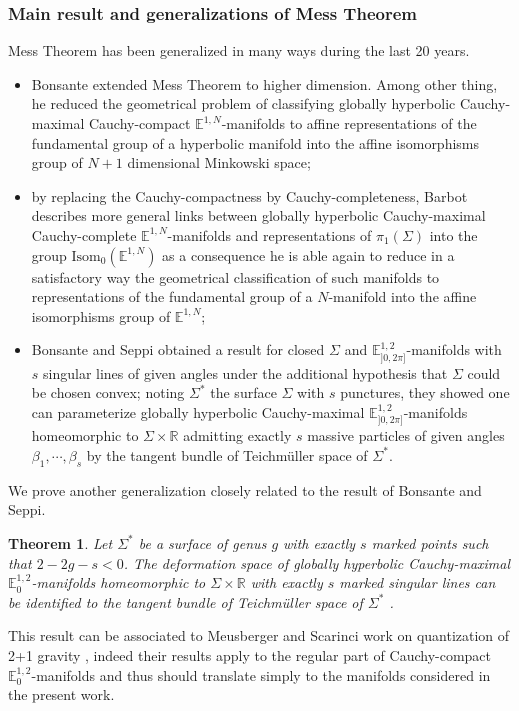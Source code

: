 \documentclass[a4paper,12pt]{article}
\def\isom{Isom}
\def\RR{\mathbb{R}}
\newcommand{\mass}[1]{{\mathbb E}^{1,2}_{#1}}
\def\isom{\mathrm{Isom}}
\newtheorem{theo}{Theorem}    %
\begin{document}
\subsubsection*{Main result and generalizations of Mess Theorem}



Mess Theorem has been generalized in many ways during the last 20 years. 
\begin{itemize}
\item  Bonsante \cite{MR2170277,MR2499272} extended Mess Theorem to higher dimension. Among other thing, he reduced the geometrical problem of classifying globally hyperbolic Cauchy-maximal Cauchy-compact $\mathbb E^{1,N}$-manifolds to affine representations of the fundamental group of a hyperbolic manifold into the affine isomorphisms group of $N+1$ dimensional Minkowski space; 
\item by replacing the Cauchy-compactness by Cauchy-completeness,  Barbot \cite{barbot_globally_2004} describes more general links between globally hyperbolic Cauchy-maximal Cauchy-complete $\mathbb{E}^{1,N}$-manifolds and representations of $\pi_1(\Sigma)$ into the group $\isom_0(\mathbb E^{1,N})$ as a consequence he is able again to reduce in a satisfactory way the geometrical classification of such manifolds to representations of the fundamental group of a $N$-manifold into the affine isomorphisms group of $\mathbb{E}^{1,N}$;

\item  Bonsante and Seppi \cite{MR3493421} obtained a result for closed $\Sigma$
 and $\mass{]0,2\pi]}$-mani\-folds with $s$ singular lines of given angles under the
additional hypothesis that $\Sigma$ could be chosen convex; noting $\Sigma^*$ the surface $\Sigma$ with $s$ punctures, they showed one can parameterize globally
hyperbolic Cauchy-maximal $\mass{]0,2\pi]}$-manifolds homeomorphic to $\Sigma\times \RR$ admitting exactly $s$ massive particles of given angles $\beta_1,\cdots,\beta_s$
by the tangent bundle of Teichmüller space of $\Sigma^*$.  
\end{itemize}  
We prove another generalization closely related to the result of Bonsante and Seppi.
\begin{theo}\label{btzthm:princ_intro}\label{theo:princ_intro} Let $\Sigma^*$ be a surface of genus $g$ with exactly $s$ marked points such that $2-2g-s<0$. The deformation space of globally hyperbolic Cauchy-maximal $\mass{0}$-manifolds homeomorphic to $\Sigma\times \RR$ with exactly $s$ marked singular lines can be identified to the tangent bundle of Teichmüller space of $\Sigma^*$ .
\end{theo}
This result can be associated to Meusberger and Scarinci work on quantization of 2+1 gravity \cite{MR3523528}, indeed their results apply to the regular part of Cauchy-compact $\mass{0}$-manifolds and thus should translate simply to the manifolds considered in the present work. 
\end{document}
